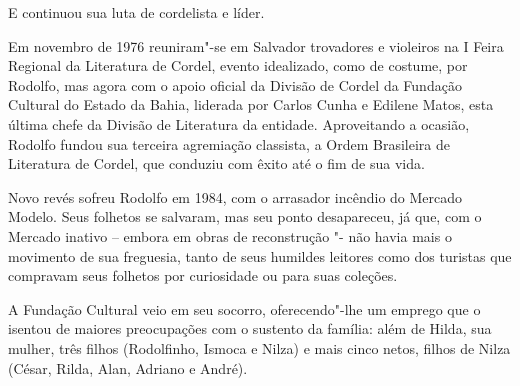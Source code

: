  E continuou sua luta de cordelista e líder. 

 Em novembro de 1976 reuniram"-se em Salvador trovadores e violeiros na
I Feira Regional da Literatura de Cordel, evento idealizado, como de
costume, por Rodolfo, mas agora com o apoio oficial da Divisão de
Cordel da Fundação Cultural do Estado da Bahia, liderada por Carlos
Cunha e Edilene Matos, esta última chefe da Divisão de Literatura da
entidade. Aproveitando a ocasião, Rodolfo fundou sua terceira
agremiação classista, a Ordem Brasileira de Literatura de Cordel, que
conduziu com êxito até o fim de sua vida. 

 Novo revés sofreu Rodolfo em 1984, com o arrasador incêndio do Mercado
Modelo. Seus folhetos se salvaram, mas seu ponto desapareceu, já que,
com o Mercado inativo -- embora em obras de reconstrução "- não havia
mais o movimento de sua freguesia, tanto de seus humildes leitores como
dos turistas que compravam seus folhetos por curiosidade ou para suas
coleções. 

 A Fundação Cultural veio em seu socorro, oferecendo"-lhe um emprego
que o isentou de maiores preocupações com o sustento da família: além
de Hilda, sua mulher, três filhos (Rodolfinho, Ismoca e Nilza) e mais
cinco netos, filhos de Nilza (César, Rilda, Alan, Adriano e André). 

